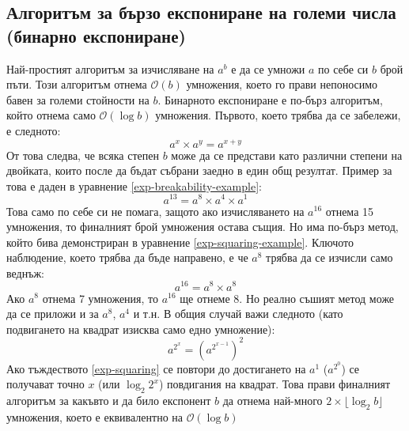   \subsection{Алгоритъм за бързо експониране на големи числа (бинарно експониране)} \label{binexp}
  Най-простият алгоритъм за изчисляване на $a^b$ е да се умножи $a$ по себе си $b$ брой пъти. Този алгоритъм отнема $\mathcal{O}(b)$ умножения, което го прави непоносимо бавен за големи стойности на $b$. Бинарното експониране е по-бърз алгоритъм, който отнема само $\mathcal{O}(\log b)$ умножения.
  Първото, което трябва да се забележи, е следното:
  \begin{equation}
    a^x \times a^y = a^{x + y}
    \label{exp-breakability}
  \end{equation}
  От това следва, че всяка степен $b$ може да се представи като различни степени на двойката, които после да бъдат събрани заедно в един общ резултат. Пример за това е даден в уравнение \ref{exp-breakability-example}:
  \begin{equation}
    a^{13} = a^8 \times a^4 \times a^1
    \label{exp-breakability-example}
  \end{equation}
  Това само по себе си не помага, защото ако изчисляването на $a^{16}$ отнема 15 умножения, то финалният брой умножения остава същия. Но има по-бърз метод, който бива демонстриран в уравнение \ref{exp-squaring-example}. Ключото наблюдение, което трябва да бъде направено, е че $a^8$ трябва да се изчисли само веднъж:
  \begin{equation}
    a^{16} = a^8 \times a^8
    \label{exp-squaring-example}
  \end{equation}
  Ако $a^8$ отнема 7 умножения, то $a^{16}$ ще отнеме 8. Но реално съшият метод може да се приложи и за $a^8$, $a^4$ и т.н. В общия случай важи следното (като подвигането на квадрат изисква само едно умножение):
  \begin{equation}
    a^{2^x} = (a^{2^{x-1}})^2
    \label{exp-squaring}
  \end{equation}
  Ако тъждеството \ref{exp-squaring} се повтори до достигането на $a^1$ ($a^{2^0}$) се получават точно $x$ (или $\log_2 2^x$) повдигания на квадрат. Това прави финалният алгоритъм за какъвто и да било експонент $b$ да отнема най-много $2 \times \lfloor \log_2 b \rfloor$ умножения, което е еквивалентно на $\mathcal{O}(\log b)$

